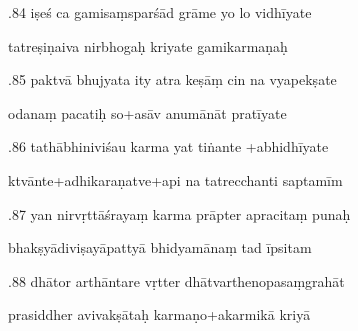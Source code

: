 \documentclass[article,12pt,a4paper]{memoir}%
\newcounter{parCount}
\begin{document}
	  
	  \pstart {}.84 iṣeś ca gamisaṃsparśād grāme yo lo vidhīyate 
	{}
	\pend%
      

	  
	  \pstart \leavevmode%
	tatreṣiṇaiva nirbhogaḥ kriyate gamikarmaṇaḥ 
	{}
	\pend%
      

	  
	  \pstart {}.85 paktvā bhujyata ity atra keṣāṃ cin na vyapekṣate 
	{}
	\pend%
      

	  
	  \pstart \leavevmode%
	odanaṃ pacatiḥ so+asāv anumānāt pratīyate 
	{}
	\pend%
      

	  
	  \pstart {}.86 tathābhiniviśau karma yat tiṅante +abhidhīyate 
	{}
	\pend%
      

	  
	  \pstart \leavevmode%
	ktvānte+adhikaraṇatve+api na tatrecchanti saptamīm 
	{}
	\pend%
      

	  
	  \pstart {}.87 yan nirvṛttāśrayaṃ karma prāpter apracitaṃ punaḥ 
	{}
	\pend%
      

	  
	  \pstart \leavevmode%
	bhakṣyādiviṣayāpattyā bhidyamānaṃ tad īpsitam 
	{}
	\pend%
      

	  
	  \pstart {}.88 dhātor arthāntare vṛtter   dhātvarthenopasaṃgrahāt 
	{}
	\pend%
      

	  
	  \pstart \leavevmode%
	prasiddher avivakṣātaḥ karmaṇo+akarmikā kriyā 
	{}
	\pend%
      
\end{document}
